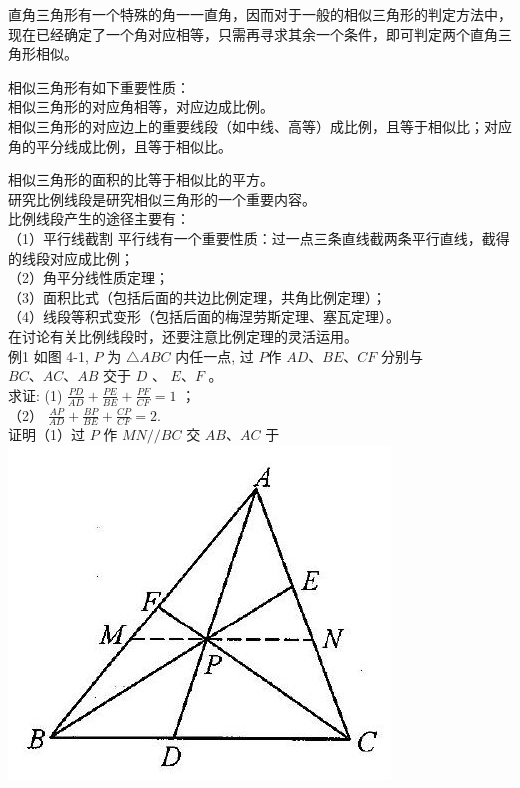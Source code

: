 \documentclass[10pt]{article}
\begin{document}
直角三角形有一个特殊的角一一直角，因而对于一般的相似三角形的判定方法中，现在已经确定了一个角对应相等，只需再寻求其余一个条件，即可判定两个直角三角形相似。

相似三角形有如下重要性质：\\
相似三角形的对应角相等，对应边成比例。\\
相似三角形的对应边上的重要线段（如中线、高等）成比例，且等于相似比；对应角的平分线成比例，且等于相似比。

相似三角形的面积的比等于相似比的平方。\\
研究比例线段是研究相似三角形的一个重要内容。\\
比例线段产生的途径主要有：\\
（1）平行线截割 平行线有一个重要性质：过一点三条直线截两条平行直线，截得的线段对应成比例；\\
（2）角平分线性质定理；\\
（3）面积比式（包括后面的共边比例定理，共角比例定理）；\\
（4）线段等积式变形（包括后面的梅涅劳斯定理、塞瓦定理）。\\
在讨论有关比例线段时，还要注意比例定理的灵活运用。\\
例1 如图 4-1, $P$ 为 $\triangle A B C$ 内任一点, 过 $P$作 $A D 、 B E 、 C F$ 分别与 $B C 、 A C 、 A B$ 交于 $D$ 、 $E 、 F$ 。\\
求证: (1) $\frac{P D}{A D}+\frac{P E}{B E}+\frac{P F}{C F}=1$ ；\\
（2） $\frac{A P}{A D}+\frac{B P}{B E}+\frac{C P}{C F}=2$.\\
证明（1）过 $P$ 作 $M N / / B C$ 交 $A B 、 A C$ 于\\
\includegraphics[max width=\textwidth, center]{2024_10_30_2c8f45efd4a519b08e1ag-037}
\end{document}

